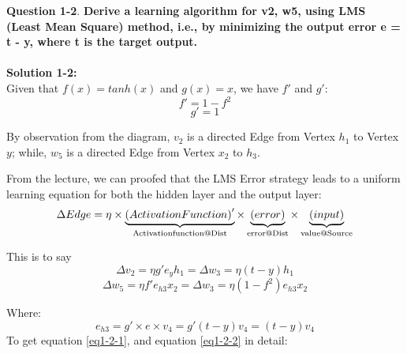 \documentclass[12pt,letterpaper]{article}
\theoremstyle{definition}
\begin{document}
\textbf{Question 1-2}. \textbf{Derive a learning algorithm for v2, w5, using LMS (Least Mean Square)
method, i.e., by minimizing the output error e = t - y, where t is the target output.}
\\

\\
\textbf{Solution 1-2:}
\\
Given that $f(x)=tanh(x)$ and $g(x)=x$, we have $f'$ and $g'$:
\[f' = 1 - {f^2}\]
\[g' = 1\]

By observation from the diagram, $v_2$ is a directed Edge from Vertex $h_1$ to Vertex $y$; while, $w_5$ is a directed Edge from Vertex $x_2$ to $h_3$.

From the lecture, we can proofed that the LMS Error strategy leads to a uniform learning equation for both the hidden layer and the output layer:
\[\Delta Edge = \eta  \times \underbrace {{{\left( {Activation Function} \right)}^\prime }}_{{\rm{Activation function @ Dist}}} \times \underbrace {\left( {error} \right)}_{{\rm{error @ Dist}}} \times \underbrace {\left( {input} \right)}_{{\rm{value @ Source}}}\]

This is to say
\begin{equation}
     \boxed{\Delta {v_2} = \eta g'{e_y}{h_1} = \Delta {w_3} = \eta \left( {t - y} \right){h_1}}\label{eq1-2-1}
\end{equation}
\begin{equation}
    \boxed{\Delta {w_5} = \eta f'{e_{h3}}{x_2} = \Delta {w_3} = \eta \left( {1 - {f^2}} \right){e_{h3}}{x_2}}\label{eq1-2-2}
\end{equation}


Where:
\[{e_{h3}} = g' \times e \times {v_4} = g'\left( {t - y} \right){v_4} = \left( {t - y} \right){v_4}\]
\noindent{\color{red} \rule{\linewidth}{0.25mm}}
To get equation \eqref{eq1-2-1}, and equation \eqref{eq1-2-2} in detail:
\end{document}
